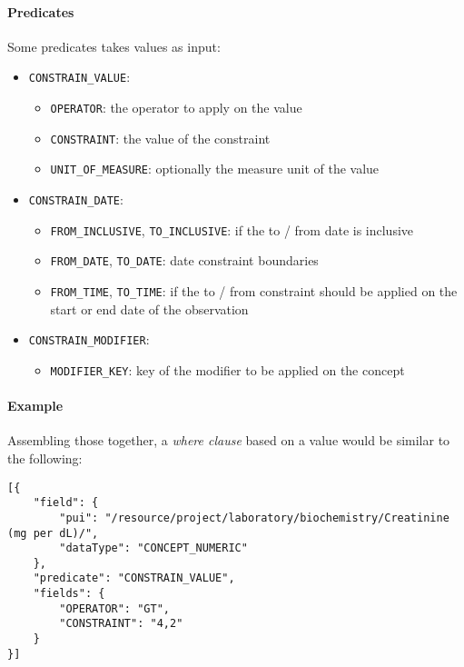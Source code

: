\paragraph{Predicates}
Some predicates takes values as input:
\begin{itemize}
    \setlength\itemsep{0em}

    \item \verb|CONSTRAIN_VALUE|:
    \begin{itemize}
        \item \verb|OPERATOR|: the operator to apply on the value 
        \item \verb|CONSTRAINT|: the value of the constraint
        \item \verb|UNIT_OF_MEASURE|: optionally the measure unit of the value
    \end{itemize}
    
    \item \verb|CONSTRAIN_DATE|:
    \begin{itemize}
        \item \verb|FROM_INCLUSIVE|, \verb|TO_INCLUSIVE|: if the to / from date is inclusive
        \item \verb|FROM_DATE|, \verb|TO_DATE|: date constraint boundaries
        \item \verb|FROM_TIME|, \verb|TO_TIME|: if the to / from constraint should be applied on the start or end date of the observation
    \end{itemize}
    
    \item \verb|CONSTRAIN_MODIFIER|:
    \begin{itemize}
        \item \verb|MODIFIER_KEY|: key of the modifier to be applied on the concept
    \end{itemize}
\end{itemize}

\paragraph{Example}
Assembling those together, a \emph{where clause} based on a value would be similar to the following:
\begin{samepage}
\begin{verbatim}
[{
    "field": {
        "pui": "/resource/project/laboratory/biochemistry/Creatinine (mg per dL)/",
        "dataType": "CONCEPT_NUMERIC"
    },
    "predicate": "CONSTRAIN_VALUE",
    "fields": {
        "OPERATOR": "GT",
        "CONSTRAINT": "4,2"
    }
}]
\end{verbatim}
\end{samepage}

